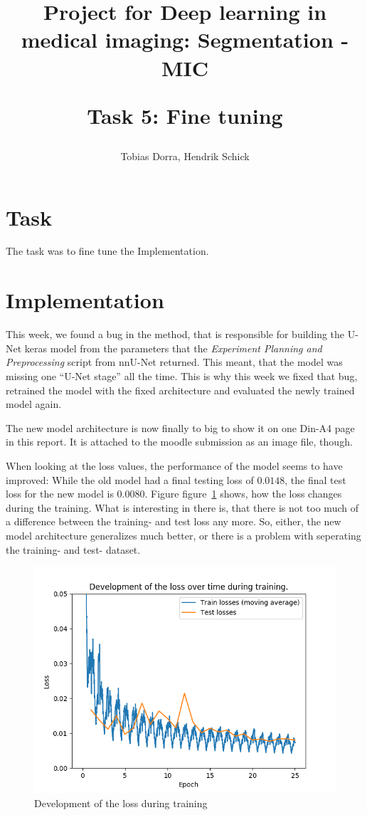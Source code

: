 \documentclass{article}
\author{Tobias Dorra, Hendrik Schick}
\title{Project for Deep learning in medical imaging: Segmentation - MIC \\ \begin{large} 
Task 5: Fine tuning
\end{large}}
\begin{document}
	
	\maketitle

	\section{Task}

		The task was to fine tune the Implementation.

	\section{Implementation}

		This week, we found a bug in the method, that is responsible for building the U-Net keras model from the parameters that the \textit{Experiment Planning and Preprocessing} script from nnU-Net returned. This meant, that the model was missing one \enquote{U-Net stage} all the time. This is why this week we fixed that bug, retrained the model with the fixed architecture and evaluated the newly trained model again.

		The new model architecture is now finally to big to show it on one Din-A4 page in this report. It is attached to the moodle submission as an image file, though.

		When looking at the loss values, the performance of the model seems to have improved: While the old model had a final testing loss of $0.0148$, the final test loss for the new model is $0.0080$. Figure figure~\ref{fig:lossdev} shows, how the loss changes during the training. What is interesting in there is, that there is not too much of a difference between the training- and test loss any more. So, either, the new model architecture generalizes much better, or there is a problem with seperating the training- and test- dataset.

		\begin{figure}[htbp]
			\centering
			\includegraphics[width=.5\textwidth]{loss_over_time.png}
			\caption{Development of the loss during training}
			\label{fig:lossdev}
		\end{figure}
\end{document}

